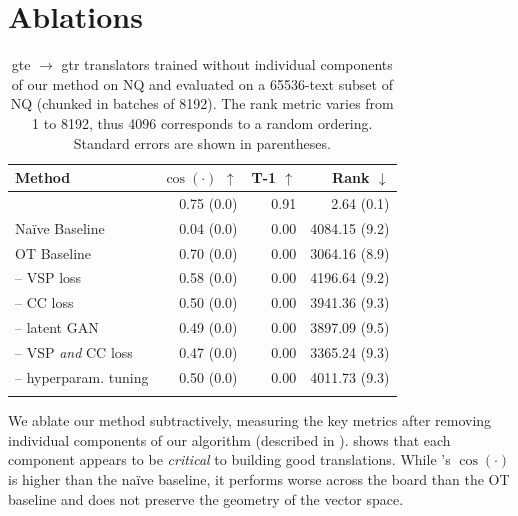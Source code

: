 \section{Ablations}
\label{sec:ablations}

\begin{table}[!ht]
    \scriptsize
    \centering
    \begin{tabular}{lrrr}
        \toprule
        Method & $\cos(\cdot)$ $\uparrow$ & T-1 $\uparrow$ & Rank $\downarrow$\\
        \midrule
        \atk{}&0.75 {\scriptsize (0.0)} & 0.91 & 2.64 {\scriptsize (0.1)}\\
        Naïve Baseline&0.04 {\scriptsize (0.0)} & 0.00 & 4084.15 {\scriptsize (9.2)}\\
        OT Baseline& 0.70 {\scriptsize (0.0)} & 0.00 & 3064.16 {\scriptsize (8.9)}\\
        \midrule
        -- VSP loss&0.58 {\scriptsize (0.0)} & 0.00 & 4196.64 {\scriptsize (9.2)}\\
        -- CC loss&0.50 {\scriptsize (0.0)} & 0.00 & 3941.36 {\scriptsize (9.3)}\\
        -- latent GAN&0.49 {\scriptsize (0.0)} & 0.00 & 3897.09 {\scriptsize (9.5)}\\
        -- VSP \textit{and} CC loss&0.47 {\scriptsize (0.0)} & 0.00 & 3365.24 {\scriptsize (9.3)}\\
        -- hyperparam. tuning&0.50 {\scriptsize (0.0)} & 0.00 & 4011.73 {\scriptsize (9.3)}\\
        \bottomrule\\[-1.6ex]
    \end{tabular}
    \caption{gte $\to$ gtr translators trained without individual components of our method on NQ and evaluated on a 65536-text subset of NQ (chunked in batches of 8192). The rank metric varies from 1 to 8192, thus 4096 corresponds to a random ordering. Standard errors are shown in parentheses.}
    \label{tab:loss_ablation}
\end{table}

 We ablate our method subtractively, measuring the key metrics after removing individual components of our algorithm (described in ).   shows that each component appears to be \textit{critical} to building good translations. While \atk{}'s $\cos(\cdot)$ is higher than the naïve baseline, it performs worse across the board than the OT baseline and does not preserve the geometry of the vector space.\\


